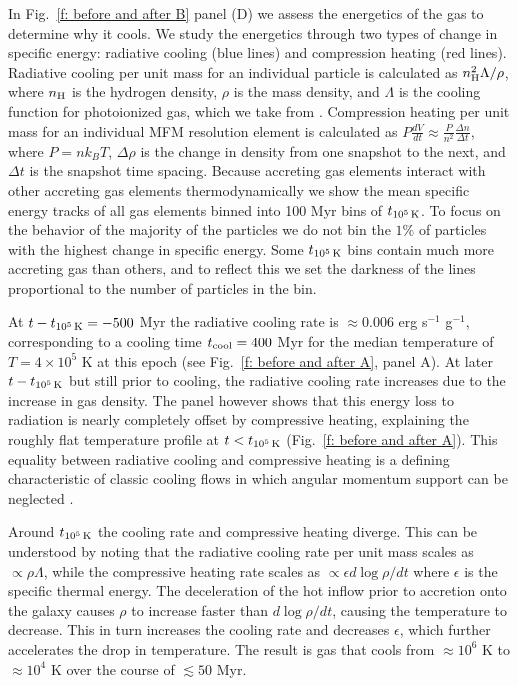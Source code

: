 \documentclass[fleqn,usenatbib]{mnras}
\newcommand{\tcools}{t_{10^5\,{\rm K}}}
\newcommand{\nH}{n_{\rm H}}
\begin{document}
In Fig.~\ref{f: before and after B} panel (D) we assess the energetics of the gas to determine why it cools.
We study the energetics through two types of change in specific energy: radiative cooling (blue lines) and compression heating (red lines).
Radiative cooling per unit mass for an individual particle is calculated as $\nH^2 \Lambda / \rho$, where $\nH$ is the hydrogen density, $\rho$ is the mass density, and $\Lambda$ is the cooling function for photoionized gas, which we take from \cite{Wiersma2009a}.
Compression heating per unit mass for an individual MFM resolution element is calculated as $P \frac{dV}{dt} \approx \frac{ P }{ n^2 } \frac{ \Delta n }{ \Delta t }$, where $P = n k_B T$, $\Delta \rho$ is the change in density from one snapshot to the next, and $\Delta t$ is the snapshot time spacing.
Because accreting gas elements interact with other accreting gas elements thermodynamically we show the mean specific energy tracks of all gas elements binned into 100 Myr bins of $\tcools$.
To focus on the behavior of the majority of the particles we do not bin the $1\%$ of particles with the highest change in specific energy.
Some $\tcools$ bins contain much more accreting gas than others, and to reflect this we set the darkness of the lines proportional to the number of particles in the bin.

At $t-\tcools=-500$ Myr the radiative cooling rate is $\approx0.006$ erg s$^{-1}$ g$^{-1}$, corresponding to a cooling time $t_{\rm cool}=400$ Myr for the median temperature of $T=4\times 10^5$ K at this epoch (see Fig.~\ref{f: before and after A}, panel A). 
At later $t-\tcools$ but still prior to cooling, the radiative cooling rate increases due to the increase in gas density.
The panel however shows that this energy loss to radiation  is nearly completely offset by compressive heating, explaining the roughly flat temperature profile at $t<\tcools$ (Fig.~\ref{f: before and after A}). 
This equality
between radiative cooling and compressive heating is a defining characteristic of classic cooling flows in which angular momentum support can be neglected \citep{Mathews1978, McNamara2007, Stern2019}. 

Around $\tcools$ the cooling rate and compressive heating diverge.
This can be understood by noting that the radiative cooling rate per unit mass scales as $\propto\rho\Lambda$, while the compressive heating rate scales as $\propto\epsilon d\log\rho/d t$ where $\epsilon$ is the specific thermal energy.
The deceleration of the hot inflow prior to accretion onto the galaxy causes $\rho$ to increase faster than $d\log\rho/d t$, causing the temperature to decrease.
This in turn increases the cooling rate and decreases $\epsilon$, which further accelerates the drop in temperature.
The result is gas that cools from $\approx10^6$ K to $\approx10^4$ K over the course of $\lesssim 50$ Myr.
\end{document}
